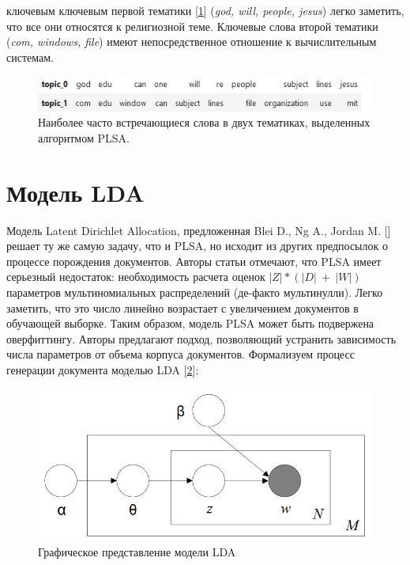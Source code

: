\documentclass[aps,%
12pt,%
final,%
oneside,
onecolumn,%
musixtex, %
superscriptaddress,%
centertags]{article} %
\begin{document}
\newpage
{} ключевым ключевым первой тематики [\ref{fig:plsa_demo}] (\textit{god, will, people, jesus}) легко заметить, что все они относятся к религиозной теме. Ключевые слова второй тематики (\textit{com, windows, file}) имеют непосредственное отношение к вычислительным системам.

\begin{figure}[h!]
  \includegraphics[width=\linewidth]{PLSA_demo.jpg}
  \caption{Наиболее часто встречающиеся слова в двух тематиках, выделенных алгоритмом PLSA.}
  \label{fig:plsa_demo}
\end{figure}

\newpage
\section*{Модель LDA}
\hspace{0.4cm}
Модель Latent Dirichlet Allocation, предложенная Blei D., Ng A., Jordan M. [\cite{andrewng1}] решает ту же самую задачу, что и PLSA, но исходит из других предпосылок о процессе порождения документов. Авторы статьи отмечают, что PLSA имеет серьезный недостаток: необходимость расчета оценок $|Z|*(|D|\ +\ |W|)$ параметров мультиномиальных распределений (де-факто мультинулли). Легко заметить, что это число линейно возрастает с увеличением документов в обучающей выборке. Таким образом, модель PLSA может быть подвержена оверфиттингу. Авторы предлагают подход, позволяющий устранить зависимость числа параметров от объема корпуса документов.
Формализуем процесс генерации документа моделью LDA [\ref{fig:lda}]:
\begin{figure}[h]
  \includegraphics[width=\linewidth]{LDA_graph.jpg}
  \caption{Графическое представление модели LDA}
  \label{fig:lda}
\end{figure}
\end{document}
